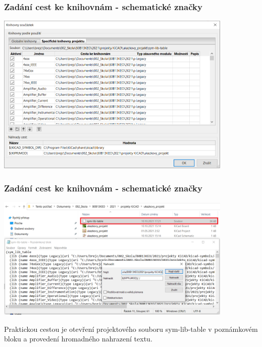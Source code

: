 \documentclass{beamer}
\begin{document}
\begin{frame}
	\frametitle{Zadání cest ke knihovnám - schematické značky}

		\begin{center}
			\includegraphics[width=0.85\textwidth]{obr/knihovny05.png}
		\end{center}
		
\end{frame}
\begin{frame}
	\frametitle{Zadání cest ke knihovnám - schematické značky}

		\begin{center}
			\includegraphics[width=0.85\textwidth]{obr/knihovny06.png}
		\end{center}
		
		Praktickou cestou je otevření projektového souboru sym-lib-table v poznámkovém bloku a provedení hromadného nahrazení textu.
\end{frame}
\end{document}
